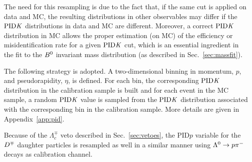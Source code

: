 The need for this resampling is due to the fact that, if the same cut is applied
on data and MC, the resulting distributions in other observables may
differ if the $\rm{PID}\it{K}$ distributions in data and MC are different.
Moreover, a correct $\rm{PID}\it{K}$ distribution in MC allows the proper
estimation (on MC) of the efficiency or misidentification rate for a given
$\rm{PID}\it{K}$ cut, which is an essential ingredient in the fit to the $B^0$ invariant
mass distribution (as described in Sec.~\ref{sec:massfit}).

The following strategy is adopted. A two-dimensional binning in momentum, $p$,
and pseudorapidity, $\eta$, is defined. For each bin, the corresponding $\rm{PID}\it{K}$
distribution in the calibration sample is built and for each event in the MC sample, 
a random $\rm{PID}\it{K}$ value is sampled from the $\rm{PID}\it{K}$ distribution
associated with the corresponding bin in the calibration sample. More details are
given in Appendix~\ref{app:pid}.

Because of the $\Lambda_{c}^\mp$ veto described in Sec.~\ref{sec:vetoes}, the PID$p$
variable for the $D^\mp$ daughter particles is resampled as well in a similar manner
using $\Lambda^{0}\rightarrow p\pi^-$ decays as calibration channel.

